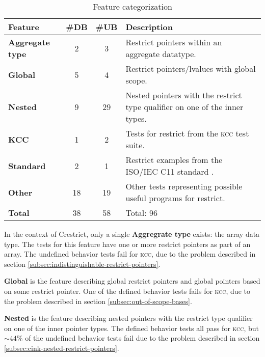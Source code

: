 \begin{table}[H]
\centering
\noindent\begin{tabularx}{\textwidth}{lccX}
\toprule
\textbf{Feature}              & \textbf{\#DB}   & \textbf{\#UB} & \textbf{Description}                            \\ \midrule
\textbf{Aggregate type}       &      2          &       3       & Restrict pointers within an aggregate datatype. \\
\textbf{Global}               &      5          &       4       & Restrict pointers/lvalues with global scope.            \\        
\textbf{Nested}               &      9          &      29       & Nested pointers with the restrict type qualifier on one of the inner types. \\ \midrule
\textbf{KCC}                  &      1          &       2       & Tests for restrict from the \textsc{kcc} test suite\footnotemark. \\
\textbf{Standard}             &      2          &       1       & Restrict examples from the ISO/IEC C11 standard \cite{ISO:2018:III}. \\
\textbf{Other}                &     18          &      19       & Other tests representing possible useful programs for restrict. \\ \midrule
\textbf{Total}                &     38          &      58       & Total: 96
\end{tabularx}
\caption{Feature categorization}
\label{table:feature-categorization}
\end{table}

In the context of Crestrict, only a single \textbf{Aggregrate type} exists: the array data type.
The tests for this feature have one or more restrict pointers as part of an array.
The undefined behavior tests fail for \textsc{kcc}, due to the problem described in section \ref{subsec:indistinguishable-restrict-pointers}.

\textbf{Global} is the feature describing global restrict pointers and global pointers based on some restrict pointer.
One of the defined behavior tests fails for \textsc{kcc}, due to the problem described in section \ref{subsec:out-of-scope-bases}.

\textbf{Nested} is the feature describing nested pointers with the restrict type qualifier on one of the inner pointer types.
The defined behavior tests all pass for \textsc{kcc}, but ${\sim}44$\% of the undefined behavior tests fail due to the problem described
in section \ref{subsec:cink-nested-restrict-pointers}.

